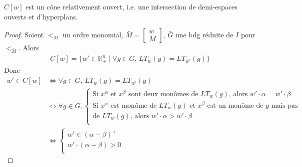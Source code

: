        \begin{coro}
            $C[w]$ est un cône relativement ouvert, i.e. une intersection de demi-espaces ouverts et d'hyperplans.
        \end{coro}
        \begin{proof}
            Soient $<_M$ un ordre monomial, $\bar M = \begin{bmatrix} w \\ M \end{bmatrix}$, $\bar G$ une bdg réduite de $I$ pour $<_{\bar M}$. Alors
            \begin{align*}
                C[w] = \{w' \in \mathbb{R}_+^n \mid \forall g \in \bar G,\, LT_w(g) = LT_{w'}(g) \}
            \end{align*}
            Donc
            \begin{align*}
                w' \in C[w] &\iff \forall g \in \bar G,\, LT_w(g) = LT_{w'}(g) \\
                &\iff \forall g \in \bar G,
                \begin{cases}
                    \text{Si $x^\alpha$ et $x^\beta$ sont deux monômes de $LT_w(g)$, alors $w' \cdot \alpha = w' \cdot \beta$} \\
                    \text{Si $x^\alpha$ est monôme de $LT_w(g)$ et $x^\beta$ est un monôme de $g$ mais pas} \\
                    \text{de $LT_w(g)$, alors $w' \cdot \alpha > w' \cdot \beta$} \\
                \end{cases} \\
                &\iff
                \begin{cases}
                    w' \in (\alpha - \beta)^\bot \\
                    w'\cdot (\alpha - \beta) > 0 \\
                \end{cases}
            \end{align*}
        \end{proof}
